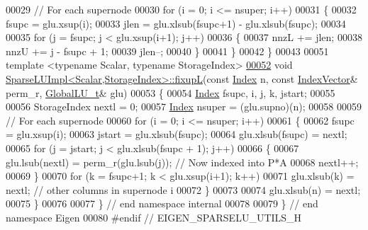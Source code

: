 \begin{DoxyCode}
00029  \textcolor{comment}{// For each supernode}
00030  \textcolor{keywordflow}{for} (i = 0; i <= nsuper; i++)
00031  \{
00032    fsupc = glu.xsup(i); 
00033    jlen = glu.xlsub(fsupc+1) - glu.xlsub(fsupc); 
00034    
00035    \textcolor{keywordflow}{for} (j = fsupc; j < glu.xsup(i+1); j++)
00036    \{
00037      nnzL += jlen; 
00038      nnzU += j - fsupc + 1; 
00039      jlen--; 
00040    \}
00041  \}
00042 \}
00043 
00051 \textcolor{keyword}{template} <\textcolor{keyword}{typename} Scalar, \textcolor{keyword}{typename} StorageIndex>
\hyperlink{group___sparse_l_u___module_ae1d1ed091956ff4e5734b4e3f79f866e}{00052} \textcolor{keywordtype}{void} \hyperlink{group___sparse_l_u___module_ae1d1ed091956ff4e5734b4e3f79f866e}{SparseLUImpl<Scalar,StorageIndex>::fixupL}(\textcolor{keyword}{const} 
      \hyperlink{namespace_eigen_a62e77e0933482dafde8fe197d9a2cfde}{Index} n, \textcolor{keyword}{const} \hyperlink{group___core___module_class_eigen_1_1_matrix}{IndexVector}& perm\_r, \hyperlink{struct_eigen_1_1internal_1_1_l_u___global_l_u__t}{GlobalLU\_t}& glu)
00053 \{
00054   \hyperlink{namespace_eigen_a62e77e0933482dafde8fe197d9a2cfde}{Index} fsupc, i, j, k, jstart; 
00055   
00056   StorageIndex nextl = 0; 
00057   \hyperlink{namespace_eigen_a62e77e0933482dafde8fe197d9a2cfde}{Index} nsuper = (glu.supno)(n); 
00058   
00059   \textcolor{comment}{// For each supernode }
00060   \textcolor{keywordflow}{for} (i = 0; i <= nsuper; i++)
00061   \{
00062     fsupc = glu.xsup(i); 
00063     jstart = glu.xlsub(fsupc); 
00064     glu.xlsub(fsupc) = nextl; 
00065     \textcolor{keywordflow}{for} (j = jstart; j < glu.xlsub(fsupc + 1); j++)
00066     \{
00067       glu.lsub(nextl) = perm\_r(glu.lsub(j)); \textcolor{comment}{// Now indexed into P*A}
00068       nextl++;
00069     \}
00070     \textcolor{keywordflow}{for} (k = fsupc+1; k < glu.xsup(i+1); k++)
00071       glu.xlsub(k) = nextl; \textcolor{comment}{// other columns in supernode i}
00072   \}
00073   
00074   glu.xlsub(n) = nextl; 
00075 \}
00076 
00077 \} \textcolor{comment}{// end namespace internal}
00078 
00079 \} \textcolor{comment}{// end namespace Eigen}
00080 \textcolor{preprocessor}{#endif // EIGEN\_SPARSELU\_UTILS\_H}
\end{DoxyCode}
